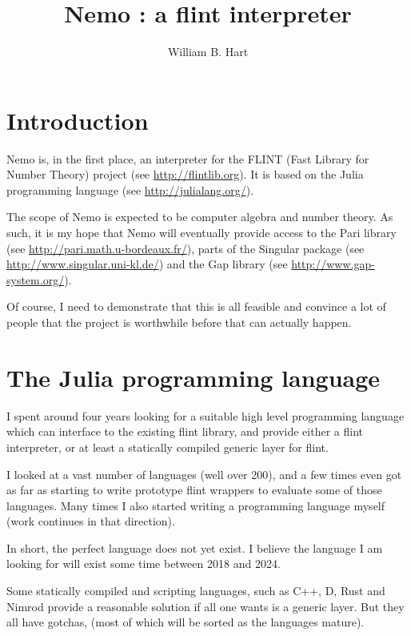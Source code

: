 \documentclass[a4paper,10pt]{article}
\title{Nemo : a flint interpreter}
\author{William B. Hart}
\begin{document}
\maketitle
\tableofcontents

\section{Introduction}

Nemo is, in the first place, an interpreter for the FLINT (Fast Library for Number Theory) project
(see \url{http://flintlib.org}). It is based on the Julia programming language
(see \url{http://julialang.org/}).

The scope of Nemo is expected to be computer algebra and number theory. As such, it is my hope that 
Nemo will eventually provide access to the Pari library (see \url{http://pari.math.u-bordeaux.fr/}),
parts of the Singular package (see \url{http://www.singular.uni-kl.de/}) and the Gap library
(see \url{http://www.gap-system.org/}).

Of course, I need to demonstrate that this is all feasible and convince a lot of people that the
project is worthwhile before that can actually happen.

\section{The Julia programming language}

I spent around four years looking for a suitable high level programming language which
can interface to the existing flint library, and provide either a flint interpreter, 
or at least a statically compiled generic layer for flint. 

I looked at a vast number of languages (well over 200), and a few times even got as far as
starting to write prototype flint wrappers to evaluate some of those languages. Many times
I also started writing a programming language myself (work continues in that direction).

In short, the perfect language does not yet exist. I believe the language I am looking
for will exist some time between 2018 and 2024.

Some statically compiled and scripting languages, such as C++, D, Rust and Nimrod provide a 
reasonable solution if all one wants is a generic layer. But they all have gotchas, (most of
which will be sorted as the languages mature).
\end{document}
